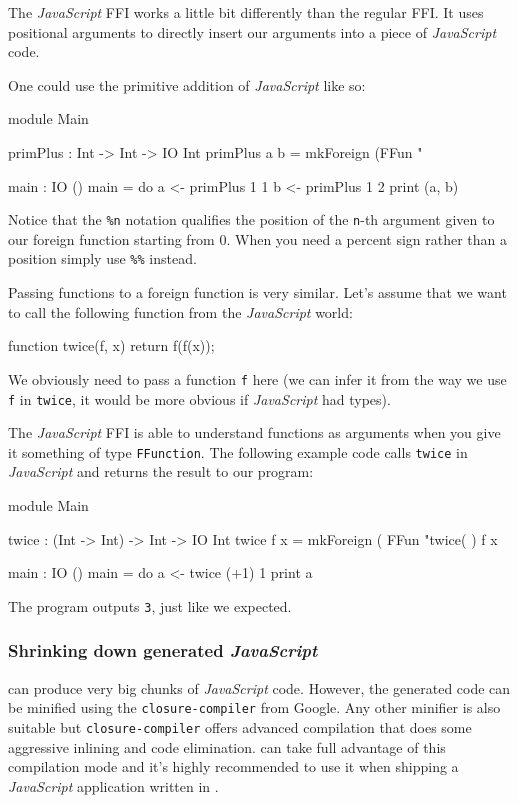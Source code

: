 \noindent
The \emph{JavaScript} FFI works a little bit differently than the regular FFI.
It uses positional arguments to directly insert our arguments into a piece of \emph{JavaScript} code.

\noindent
One could use the primitive addition of \emph{JavaScript} like so:

\begin{code}
module Main

primPlus : Int -> Int -> IO Int
primPlus a b = mkForeign (FFun "%

main : IO ()
main = do
  a <- primPlus 1 1
  b <- primPlus 1 2
  print (a, b)
\end{code}

\noindent
Notice that the \texttt{\%n} notation qualifies the position of the \texttt{n}-th argument given to our foreign function starting from 0.
When you need a percent sign rather than a position simply use \texttt{\%\%} instead.

\noindent
Passing functions to a foreign function is very similar.
Let's assume that we want to call the following function from the \emph{JavaScript} world:

\begin{code}[language=c]
function twice(f, x) {
  return f(f(x));
}
\end{code}

\noindent
We obviously need to pass a function \texttt{f} here (we can infer it from the way we use \texttt{f} in \texttt{twice}, it would be more obvious if \emph{JavaScript} had types).

\noindent
The \emph{JavaScript} FFI is able to understand functions as arguments when you give it something of type \texttt{FFunction}.
The following example code calls \texttt{twice} in \emph{JavaScript} and returns the result to our \Idris{} program:

\begin{code}
module Main

twice : (Int -> Int) -> Int -> IO Int
twice f x = mkForeign (
  FFun "twice(%
) f x

main : IO ()
main = do
  a <- twice (+1) 1
  print a
\end{code}

\noindent
The program outputs \texttt{3}, just like we expected.

\subsubsection*{Shrinking down generated \emph{JavaScript}}

\Idris{} can produce very big chunks of \emph{JavaScript} code.
However, the generated code can be minified using the \texttt{closure-compiler} from Google.
Any other minifier is also suitable but \texttt{closure-compiler} offers advanced compilation that does some aggressive inlining and code elimination.
\Idris{} can take full advantage of this compilation mode and it's highly recommended to use it when shipping a \emph{JavaScript} application written in \Idris{}.

